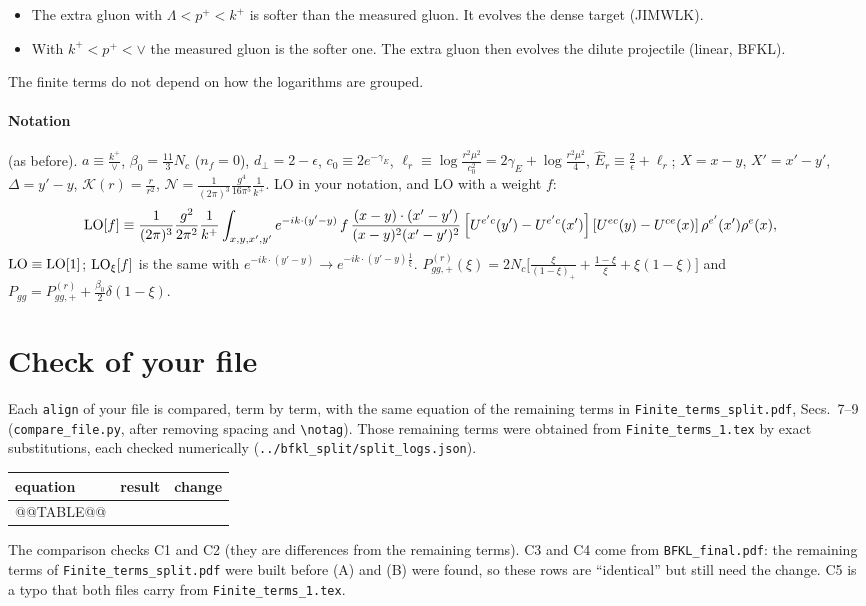 \documentclass[9pt]{article}
\newcommand{\KK}{\mathcal K}
\numberwithin{equation}{section}
\begin{document}
\begin{itemize}
\begin{itemize}
\item The extra gluon with $\Lambda<p^+<k^+$ is softer than the measured gluon. It evolves the dense target (JIMWLK).
\item With $k^+<p^+<\vee$ the measured gluon is the softer one. The extra gluon then evolves the dilute projectile (linear, BFKL).
\end{itemize}
The finite terms do not depend on how the logarithms are grouped.
\end{itemize}

\paragraph{Notation} (as before). $a\equiv\frac{k^+}{\vee}$, $\beta_0=\frac{11}{3}N_c$ ($n_f=0$), $d_\perp=2-\epsilon$, $c_0\equiv2e^{-\gamma_E}$, $\ell_r\equiv\log\frac{r^2\mu^2}{c_0^2}=2\gamma_E+\log\frac{r^2\mu^2}{4}$, $\hat E_r\equiv\frac2\epsilon+\ell_r$; $X=x-y$, $X'=x'-y'$, $\Delta=y'-y$, $\KK(r)=\frac{r}{r^2}$, $\mathcal N=\frac{1}{(2\pi)^3}\frac{g^4}{16\pi^5}\frac{1}{k^+}$. LO in your notation, and LO with a weight $f$:
\begin{align*}
{\rm LO}[f]&\equiv\frac{1}{(2\pi)^{3}}\frac{g^{2}}{2\pi^{2}}\frac{1}{k^{+}}\int_{x,y,x',y'}e^{-ik\cdot(y'-y)}\,f\,\frac{(x-y)\cdot(x'-y')}{(x-y)^{2}(x'-y')^{2}}\left[U^{e'c}(y')-U^{e'c}(x')\right]\left[U^{ec}(y)-U^{ce}(x)\right]\rho^{e'}(x')\rho^{e}(x),
\end{align*}
${\rm LO}\equiv{\rm LO}[1]$; ${\rm LO}_\xi[f]$ is the same with $e^{-ik\cdot(y'-y)}\to e^{-ik\cdot(y'-y)\frac1\xi}$. $P^{(r)}_{gg,+}(\xi)=2N_c\big[\frac{\xi}{(1-\xi)_+}+\frac{1-\xi}{\xi}+\xi(1-\xi)\big]$ and $P_{gg}=P^{(r)}_{gg,+}+\frac{\beta_0}{2}\delta(1-\xi)$.

\section{Check of your file}\label{sec:check}
Each \texttt{align} of your file is compared, term by term, with the same equation of the remaining terms in \texttt{Finite\_terms\_split.pdf}, Secs.~7--9 (\texttt{compare\_file.py}, after removing spacing and \verb|\notag|). Those remaining terms were obtained from \texttt{Finite\_terms\_1.tex} by exact substitutions, each checked numerically (\texttt{../bfkl\_split/split\_logs.json}).
\begin{center}\small
\begin{longtable}{@{}lll@{}}\toprule
equation & result & change\\\midrule\endhead
@@TABLE@@
\bottomrule
\end{longtable}
\end{center}
The comparison checks C1 and C2 (they are differences from the remaining terms). C3 and C4 come from \texttt{BFKL\_final.pdf}: the remaining terms of \texttt{Finite\_terms\_split.pdf} were built before (A) and (B) were found, so these rows are ``identical'' but still need the change. C5 is a typo that both files carry from \texttt{Finite\_terms\_1.tex}.
\end{document}
